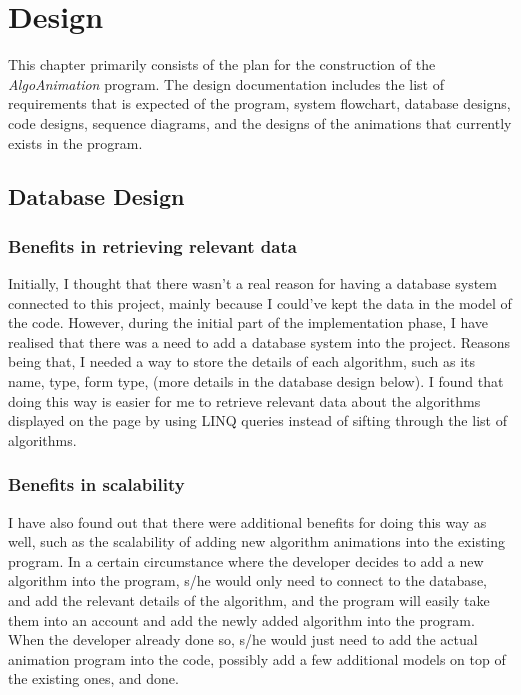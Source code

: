 \chapter{Design}

This chapter primarily consists of the plan for the construction of the \textit{AlgoAnimation} program. The design documentation includes the list of requirements that is expected of the program, system flowchart, database designs, code designs, sequence diagrams, and the designs of the animations that currently exists in the program. 

\section{Database Design}

\subsection{Benefits in retrieving relevant data}
Initially, I thought that there wasn't a real reason for having a database system connected to this project, mainly because I could've kept the data in the model of the code. However, during the initial part of the implementation phase, I have realised that there was a need to add a database system into the project. Reasons being that, I needed a way to store the details of each algorithm, such as its name, type, form type, (more details in the database design below). I found that doing this way is easier for me to retrieve relevant data about the algorithms displayed on the page by using LINQ queries instead of sifting through the list of algorithms. 

\subsection{Benefits in scalability}
I have also found out that there were additional benefits for doing this way as well, such as the scalability of adding new algorithm animations into the existing program. In a certain circumstance where the developer decides to add a new algorithm into the program, s/he would only need to connect to the database, and add the relevant details of the algorithm, and the program will easily take them into an account and add the newly added algorithm into the program. When the developer already done so, s/he would just need to add the actual animation program into the code, possibly add a few additional models on top of the existing ones, and done.

